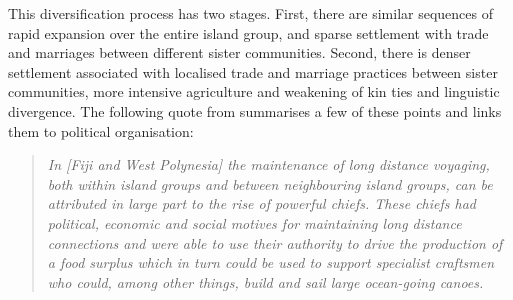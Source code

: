 \documentclass[a4paper,10pt]{article} %
\begin{document}

This diversification process has two stages. First, there are similar sequences of rapid expansion over the entire island group, and sparse settlement with trade and marriages between different sister communities. Second, there is denser settlement associated with localised trade and marriage practices between sister communities, more intensive agriculture and weakening of kin ties and linguistic divergence. The following quote from \citet{pawley2007} summarises a few of these points and links them to political organisation:

\begin{quotation}
\noindent \emph{In [Fiji and West Polynesia] the maintenance of long distance voyaging, both within island groups and between neighbouring island groups, can be attributed in large part to the rise of powerful chiefs. These chiefs had political, economic and social motives for maintaining long distance connections and were able to use their authority to drive the production of a food surplus which in turn could be used to support specialist craftsmen who could, among other things, build and sail large ocean-going canoes.} \citep[28]{pawley2007} \end{quotation}
\end{document}

